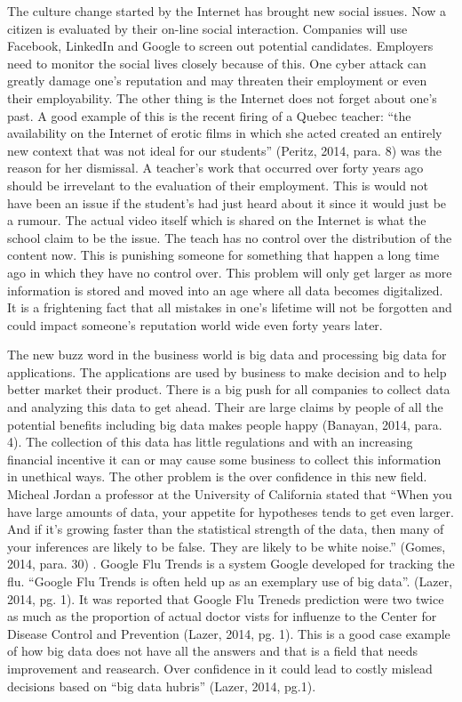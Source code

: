 \documentclass[12pt]{article}
\begin{document}
The culture change started by the Internet has brought new social issues. Now a citizen is evaluated by their on-line social interaction. Companies will use Facebook, LinkedIn and Google to screen out potential candidates. Employers need to monitor the social lives closely because of this. One cyber attack can greatly damage one's reputation and may threaten their employment or even their employability. The other thing is the Internet does not forget about one's past. A good example of this is the recent firing of a Quebec teacher: ``the availability on the Internet of erotic films in which she acted created an entirely new context that was not ideal for our students'' (Peritz, 2014, para. 8) was the reason for her dismissal. A teacher's work that occurred over forty years ago should be irrevelant to the evaluation of their employment. This is would not have been an issue if the student's had just heard about it since it would just be a rumour. The actual video itself which is shared on the Internet is what the school claim to be the issue. The teach has no control over the distribution of the content now. This is punishing someone for something that happen a long time ago in which they have no control over. This problem will only get larger as more information is stored and moved into an age where all data becomes digitalized. It is a frightening fact that all mistakes in one's lifetime will not be forgotten and could impact someone's reputation world wide even forty years later.

The new buzz word in the business world is big data and processing big data for applications. The applications are used by business to make decision and to help better market their product. There is a big push for all companies to collect data and analyzing this data to get ahead. Their are large claims by people of all the potential benefits including big data makes people happy (Banayan, 2014, para. 4). The collection of this data has little regulations and with an increasing financial incentive it can or may cause some business to collect this information in unethical ways. The other problem is the over confidence in this new field. Micheal Jordan a professor at the University of California stated that ``When you have large amounts of data, your appetite for hypotheses tends to get even larger. And if it’s growing faster than the statistical strength of the data, then many of your inferences are likely to be false. They are likely to be white noise.'' (Gomes, 2014, para. 30) . Google Flu Trends is a system Google developed for tracking the flu. ``Google Flu Trends is often held up as an exemplary use of big data''. (Lazer, 2014, pg. 1). It was reported that Google Flu Treneds prediction were two twice as much as the proportion of actual doctor vists for influenze  to the Center for Disease Control and Prevention (Lazer, 2014, pg. 1). This is a good case example of how big data does not have all the answers and that is a field that needs improvement and reasearch. Over confidence in it could lead to costly mislead decisions based on ``big data hubris'' (Lazer, 2014, pg.1).
\end{document}

